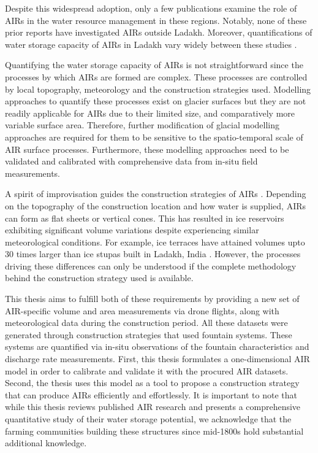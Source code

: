 Despite this widespread adoption, only a few publications examine the role of AIRs in the water resource
management in these regions. Notably, none of these prior reports have investigated AIRs outside Ladakh.
Moreover, quantifications of water storage capacity of AIRs in Ladakh vary widely between these studies
\citep{norphelSnowWaterHarvesting2015, baglaArtificialGlaciersHelp1998}.

Quantifying the water storage capacity of AIRs is not straightforward since the processes by which AIRs are
formed are complex. These processes are controlled by local topography, meteorology and the construction
strategies used. Modelling approaches to quantify these processes exist on glacier surfaces but they are not
readily applicable for AIRs due to their limited size, and comparatively more variable surface area. Therefore,
further modification of glacial modelling approaches are required for them to be sensitive to the
spatio-temporal scale of AIR surface processes. Furthermore, these modelling approaches need to be validated and
calibrated with comprehensive data from in-situ field measurements. 

A spirit of improvisation guides the construction strategies of AIRs \citep{clouseLadakhArtificialGlaciers2017}.
Depending on the topography of the construction location and how water is supplied, AIRs can form as flat sheets
or vertical cones. This has resulted in ice reservoirs exhibiting significant volume variations despite
experiencing similar meteorological conditions. For example, ice terraces have attained volumes upto 30 times
larger than ice stupas built in Ladakh, India \citep{nusserSociohydrologyArtificialGlaciers2019}. However, the
processes driving these differences can only be understood if the complete methodology behind the construction
strategy used is available.

This thesis aims to fulfill both of these requirements by providing a new set of AIR-specific volume and area
measurements via drone flights, along with meteorological data during the construction period. All these
datasets were generated through construction strategies that used fountain systems. These systems are quantified via in-situ
observations of the fountain characteristics and discharge rate measurements. First, this thesis
formulates a one-dimensional AIR model in order to calibrate and validate it with the procured AIR datasets.
Second, the thesis uses this model as a tool to propose a construction strategy that can produce AIRs
efficiently and effortlessly. It is important to note that while this thesis reviews published AIR research and
presents a comprehensive quantitative study of their water storage potential, we acknowledge that the farming
communities building these structures since mid-1800s hold substantial additional knowledge.


